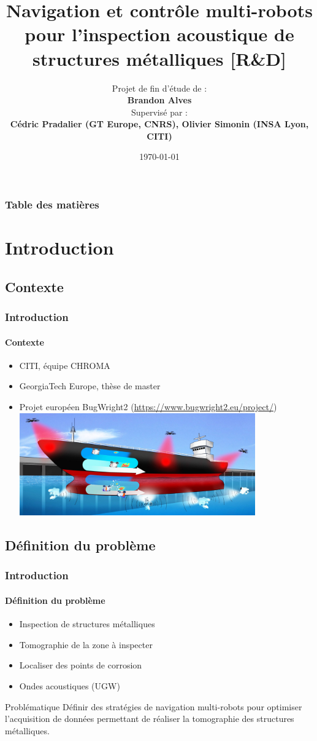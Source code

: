 \documentclass{beamer}
\title[Projet de Fin d'Étude]{Navigation et contrôle multi-robots pour l'inspection acoustique de structures métalliques [R\&D]}
\author[Brandon Alves]{
	Projet de fin d'étude de : \\
	\textbf{Brandon Alves} \\
	\vspace*{.25cm}
	\footnotesize Supervisé par : \\
	\textbf{Cédric Pradalier (GT Europe, CNRS), Olivier Simonin (INSA Lyon, CITI)}
}
\institute[INSA Lyon, CITI]{INSA Lyon, Laboratoire CITI, équipe CHROMA (INSA \& INRIA)}
\date{\today}
\begin{document}
	\begin{frame}
		\titlepage
	\end{frame}
	\begin{frame}[shrink=0]
		\frametitle{Table des matières}
		\tableofcontents
	\end{frame}
	\section{Introduction}
		\subsection*{Contexte}
			\begin{frame}
				\frametitle{Introduction}
				\framesubtitle{Contexte}
				\begin{itemize}
					\item CITI, équipe CHROMA
					\item GeorgiaTech Europe, thèse de master
					\item Projet européen BugWright2 (\url{https://www.bugwright2.eu/project/})
					\includegraphics[width=0.8\textwidth]{graphics/Concept-Cartoon-NJ3-e1582812224528.jpg}
				\end{itemize}
			\end{frame}
		\subsection*{Définition du problème}
			\begin{frame}
				\frametitle{Introduction}
				\framesubtitle{Définition du problème}
				\begin{itemize}
					\item Inspection de structures métalliques
					\item Tomographie de la zone à inspecter
					\item Localiser des points de corrosion
					\item Ondes acoustiques (UGW)
				\end{itemize}
				\begin{block}{Problématique}
					Définir des stratégies de navigation multi-robots pour optimiser l'acquisition de données permettant de réaliser la tomographie des structures métalliques.
				\end{block}
			\end{frame}
\end{document}
